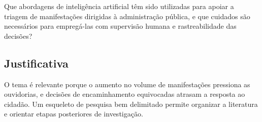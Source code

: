 Que abordagens de inteligência artificial têm sido utilizadas para apoiar a triagem de manifestações dirigidas à administração pública, e que cuidados são necessários para empregá-las com supervisão humana e rastreabilidade das decisões?

\subsection{Justificativa}

O tema é relevante porque o aumento no volume de manifestações pressiona as ouvidorias, e decisões de encaminhamento equivocadas atrasam a resposta ao cidadão. Um esqueleto de pesquisa bem delimitado permite organizar a literatura e orientar etapas posteriores de investigação.
